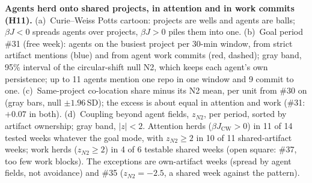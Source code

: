 \caption{\textbf{Agents herd onto shared projects, in attention and in work commits (H11).}
(a)~Curie--Weiss Potts cartoon: projects are wells and agents are balls; $\beta J<0$ spreads agents over projects, $\beta J>0$ piles them into one.
(b)~Goal period \#31 (free week): agents on the busiest project per 30-min window, from strict artifact mentions (blue) and from agent work commits (red, dashed); gray band, 95\% interval of the circular-shift null N2, which keeps each agent's own persistence; up to 11 agents mention one repo in one window and 9 commit to one.
(c)~Same-project co-location share minus its N2 mean, per unit from \#30 on (gray bars, null $\pm1.96$\,SD); the excess is about equal in attention and work (\#31: $+0.07$ in both).
(d)~Coupling beyond agent fields, $z_{N2}$, per period, sorted by artifact ownership; gray band, $|z|<2$. Attention herds ($\beta J_\mathrm{CW}>0$) in 11 of 14 tested weeks whatever the goal mode, with $z_{N2}\ge2$ in 10 of 11 shared-artifact weeks; work herds ($z_{N2}\ge2$) in 4 of 6 testable shared weeks (open square: \#37, too few work blocks). The exceptions are own-artifact weeks (spread by agent fields, not avoidance) and \#35 ($z_{N2}=-2.5$, a shared week against the pattern).}
\label{fig:H11}
